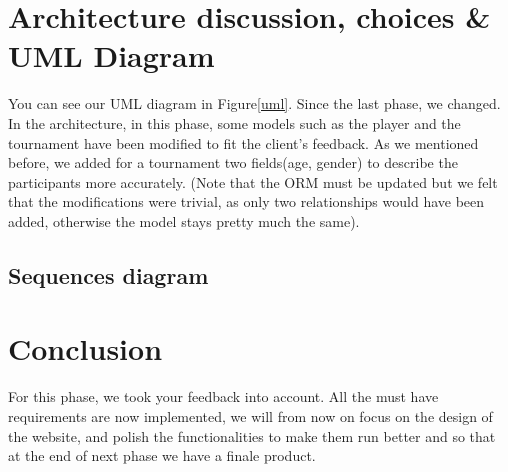 \documentclass[a4paper, 12pt]{article}
\begin{document}
\newpage
\section{Architecture discussion, choices \& UML Diagram}

You can see our UML diagram in Figure\ref{uml}. Since the last phase, we changed.\\

In the architecture, in this phase, some models such as the player and the tournament have been modified to fit the client's feedback. As we mentioned before, we added for a tournament two fields(age, gender) to describe the participants more accurately. (Note that the ORM must be updated but we felt that the modifications were trivial, as only two relationships would have been added, otherwise the model stays pretty much the same). 


\subsection*{Sequences diagram}


\section{Conclusion}

For this phase, we took your feedback into account. All the must have requirements are now implemented, we will from now on focus on the design of the website, and polish the functionalities to make them run better and so that at the end of next phase we have a finale product. 
\end{document}
